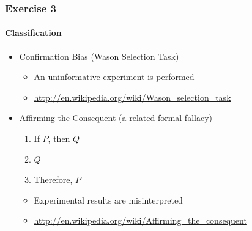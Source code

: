 \begin{frame}
  \frametitle{Exercise 3}
  \framesubtitle{Classification}
  \begin{itemize}
    \item Confirmation Bias (Wason Selection Task)
    \begin{itemize}
      \item An uninformative experiment is performed
      \item \url{http://en.wikipedia.org/wiki/Wason_selection_task}
    \end{itemize}
    \item Affirming the Consequent (a related formal fallacy)
    \begin{enumerate}
     \item If $P$, then $Q$
     \item $Q$
     \item Therefore, $P$
    \end{enumerate}
    \begin{itemize}
      \item Experimental results are misinterpreted
      \item \url{http://en.wikipedia.org/wiki/Affirming_the_consequent}
    \end{itemize}
  \end{itemize}
\end{frame}
